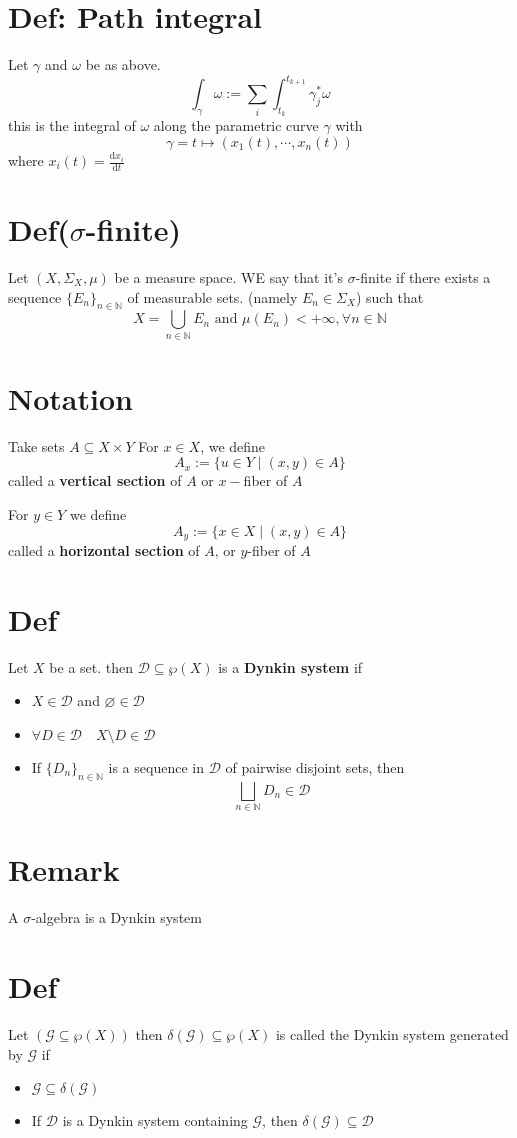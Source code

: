 \documentclass{book}
\begin{document}
\section{Def: Path integral}
\label{Def 52.2}
Let $\gamma$ and $\omega$ be as above.
$$\int_\gamma\omega:=\sum\limits_i\int_{t_k}^{t_{k+1}}\gamma_j^*\omega$$
this is the integral of $\omega$ along the parametric curve $\gamma$ with
$$\gamma=t\mapsto(x_1(t),\cdots,x_n(t))$$
where $x_i(t)=\frac{\text{d}x_i}{\text{d}t}$
\section{Def($\sigma$-finite)}
Let $(X,\Sigma_X,\mu)$ be a measure space. WE say that it's $\sigma$-finite if there exists a sequence $\{E_n\}_{n\in \mathbb{N}}$ of measurable sets. (namely $E_n\in \Sigma_X$) such that $$X=\bigcup\limits_{n\in \mathbb{N}}E_n\text{ and }\mu(E_n)<+\infty, \forall n\in \mathbb{N}$$
\section{Notation}
Take sets $A\subseteq X\times Y$ For $x\in X$, we define
$$A_x:=\{u\in Y\mid(x,y)\in A\}$$
called a \textbf{vertical section} of $A$ or $x-$fiber of $A$

For $y\in Y$ we define
$$A_y:=\{x\in X\mid(x,y)\in A\}$$
called a \textbf{horizontal section} of $A$, or $y$-fiber of $A$
\section{Def}
Let $X$ be a set. then $\mathscr{D}\subseteq\wp(X)$ is a \textbf{Dynkin system} if 
\begin{itemize}
    \item $X\in \mathscr{D}$ and $\varnothing\in \mathscr{D}$
    \item $\forall D\in \mathscr{D}\quad X\setminus D\in \mathscr{D}$
    \item If $\{D_n\}_{n\in \mathbb{N}}$ is a sequence in $\mathscr{D}$ of pairwise disjoint sets, then $$\bigsqcup\limits_{n\in \mathbb{N}}D_n\in \mathscr{D}$$
\end{itemize}
\section*{Remark}
A $\sigma$-algebra is a Dynkin system
\section{Def}
Let $(\mathcal{G}\subseteq\wp(X))$ then $\delta(\mathcal{G})\subseteq\wp(X)$ is called the Dynkin system generated by $\mathcal{G}$ if \begin{itemize}
    \item $\mathcal{G}\subseteq\delta(\mathcal{G})$
    \item If $\mathscr{D}$ is a Dynkin system containing $\mathcal{G}$, then $\delta(\mathcal{G})\subseteq\mathscr{D}$
\end{itemize}
\end{document}
